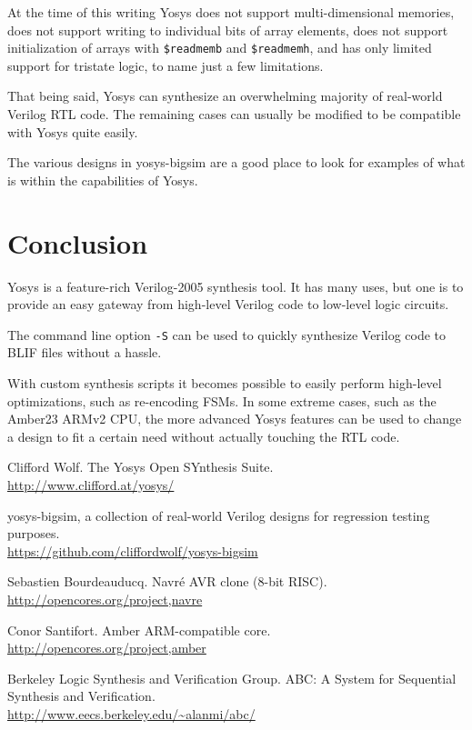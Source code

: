 \documentclass[9pt,technote,a4paper]{IEEEtran}
\begin{document}
At the time of this writing Yosys does not support multi-dimensional memories,
does not support writing to individual bits of array elements, does not
support initialization of arrays with {\tt \$readmemb} and {\tt \$readmemh},
and has only limited support for tristate logic, to name just a few
limitations.

That being said, Yosys can synthesize an overwhelming majority of real-world
Verilog RTL code. The remaining cases can usually be modified to be compatible
with Yosys quite easily.

The various designs in yosys-bigsim are a good place to look for examples
of what is within the capabilities of Yosys.

\section{Conclusion}

Yosys is a feature-rich Verilog-2005 synthesis tool. It has many uses, but
one is to provide an easy gateway from high-level Verilog code to low-level
logic circuits.

The command line option {\tt -S} can be used to quickly synthesize Verilog
code to BLIF files without a hassle.

With custom synthesis scripts it becomes possible to easily perform high-level
optimizations, such as re-encoding FSMs. In some extreme cases, such as the
Amber23 ARMv2 CPU, the more advanced Yosys features can be used to change a
design to fit a certain need without actually touching the RTL code.

\begin{thebibliography}{9}

Clifford Wolf. The Yosys Open SYnthesis Suite. \\
\url{http://www.clifford.at/yosys/}

yosys-bigsim, a collection of real-world Verilog designs for regression testing purposes. \\
\url{https://github.com/cliffordwolf/yosys-bigsim}

Sebastien Bourdeauducq. Navré AVR clone (8-bit RISC). \\
\url{http://opencores.org/project,navre}

Conor Santifort. Amber ARM-compatible core. \\
\url{http://opencores.org/project,amber}

Berkeley Logic Synthesis and Verification Group. ABC: A System for Sequential Synthesis and Verification. \\
\url{http://www.eecs.berkeley.edu/~alanmi/abc/}

\end{thebibliography}
\end{document}
